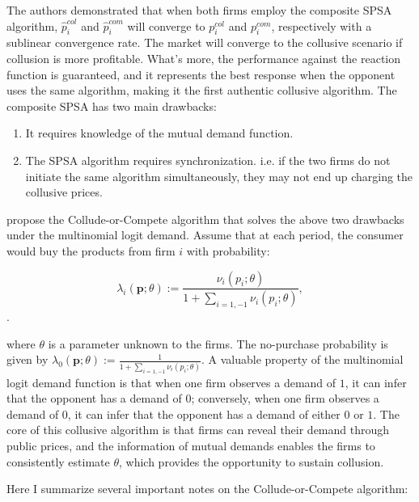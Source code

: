 \documentclass[mnsc,nonblindrev]{workingpaper}
\begin{document}
The authors demonstrated that when both firms employ the composite SPSA algorithm, $\hat{p}_{i}^{col}$ and $\hat{p}_{i}^{com}$ will converge to $p_{i}^{col}$ and $p_{i}^{com}$, respectively with a sublinear convergence rate. The market will converge to the collusive scenario if collusion is more profitable. What's more, the performance against the reaction function is guaranteed, and it represents the best response when the opponent uses the same algorithm, making it the first authentic collusive algorithm. The composite SPSA has two main drawbacks:

\begin{enumerate}
    \item It requires knowledge of the mutual demand function.
    \item The SPSA algorithm requires synchronization. i.e. if the two firms do not initiate the same algorithm simultaneously, they may not end up charging the collusive prices.
\end{enumerate}

\cite{loots2023data} propose the Collude-or-Compete algorithm that solves the above two drawbacks under the multinomial logit demand. Assume that at each period, the consumer would buy the products from firm $i$ with probability:

\begin{equation}
    \lambda_i(\mathbf{p};\theta):=\frac{\nu_i(p_i;\theta)}{1+\sum_{i={1,-1}}\nu_i(p_i;\theta)},
\end{equation}.

where $\theta$ is a parameter unknown to the firms. The no-purchase probability is given by $\lambda_0(\mathbf{p};\theta):=\frac{1}{1+\sum_{i={1,-1}}\nu_i(p_i;\theta)}$. A valuable property of the multinomial logit demand function is that when one firm observes a demand of $1$, it can infer that the opponent has a demand of $0$; conversely, when one firm observes a demand of $0$, it can infer that the opponent has a demand of either $0$ or $1$. The core of this collusive algorithm is that firms can reveal their demand through public prices, and the information of mutual demands enables the firms to consistently estimate $\theta$, which provides the opportunity to sustain collusion.

Here I summarize several important notes on the Collude-or-Compete algorithm:
\end{document}

